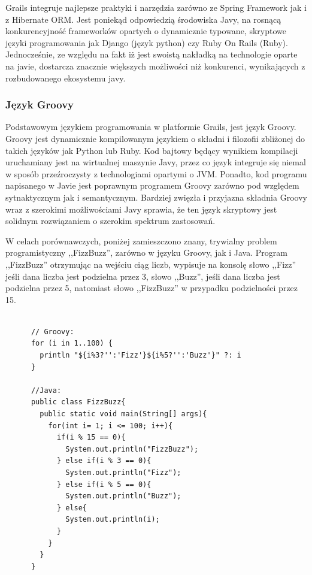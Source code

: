    Grails integruje najlepsze praktyki i narzędzia zarówno ze Spring Framework jak i z Hibernate ORM. Jest poniekąd odpowiedzią środowiska Javy, na rosnącą konkurencyjność frameworków opartych o dynamicznie typowane, skryptowe języki programowania jak Django (język python) czy Ruby On Rails (Ruby). Jednocześnie, ze względu na fakt iż jest swoistą nakładką na technologie oparte na javie, dostarcza znacznie większych możliwości niż konkurenci, wynikających z rozbudowanego ekosystemu javy.


    \subsubsection{Język Groovy}

      Podstawowym językiem programowania w platformie Grails, jest język Groovy. Groovy jest dynamicznie kompilowanym językiem o składni i filozofii zbliżonej do takich języków jak Python lub Ruby. Kod bajtowy będący wynikiem kompilacji uruchamiany jest na wirtualnej maszynie Javy, przez co język integruje się niemal w sposób przeźroczysty z technologiami opartymi o JVM. Ponadto, kod programu napisanego w Javie jest poprawnym programem Groovy zarówno pod względem sytnaktycznym jak i semantycznym. Bardziej zwięzła i przyjazna składnia Groovy wraz z szerokimi możliwościami Javy sprawia, że ten język skryptowy jest solidnym rozwiązaniem o szerokim spektrum zastosowań.

      W celach porównawczych, poniżej zamieszczono znany, trywialny problem programistyczny ,,FizzBuzz'', zarówno w języku Groovy, jak i Java. Program ,,FizzBuzz'' otrzymując na wejściu ciąg liczb, wypisuje na konsolę słowo ,,Fizz'' jeśli dana liczba jest podzielna przez 3, słowo ,,Buzz'', jeśli dana liczba jest podzielna przez 5, natomiast słowo ,,FizzBuzz'' w przypadku podzielności przez 15.

    \begin{verbatim}

      // Groovy:
      for (i in 1..100) {
        println "${i%3?'':'Fizz'}${i%5?'':'Buzz'}" ?: i
      }    

      //Java:
      public class FizzBuzz{
        public static void main(String[] args){
          for(int i= 1; i <= 100; i++){
            if(i % 15 == 0){
              System.out.println("FizzBuzz");
            } else if(i % 3 == 0){
              System.out.println("Fizz");
            } else if(i % 5 == 0){
              System.out.println("Buzz");
            } else{
              System.out.println(i);
            }
          }
        }
      }

    \end{verbatim}


